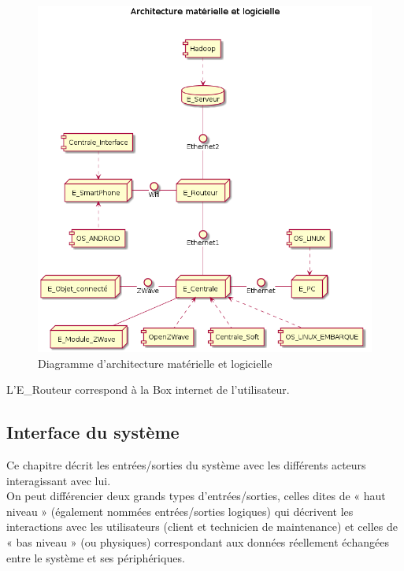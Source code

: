 \documentclass[10pt,a4paper]{report}
\begin{document}
\begin{figure}[H]
	\centering
	\includegraphics[scale=0.55]{diagArchiMatSof}
	\caption{Diagramme d'architecture matérielle et logicielle}
	\label{diagArchiMatSof}
\end{figure}

L'E\_Routeur correspond à la Box internet de l'utilisateur.
\newpage

			\subsection{Interface du système}
		
Ce chapitre décrit les entrées/sorties du système avec les différents acteurs interagissant avec lui. \\

On peut différencier deux grands types d’entrées/sorties, celles dites de « haut niveau » (également nommées entrées/sorties logiques) qui décrivent les interactions avec les utilisateurs (client et technicien de maintenance) et celles de « bas niveau » (ou physiques) correspondant aux données réellement échangées entre le système et ses périphériques.
\end{document}
